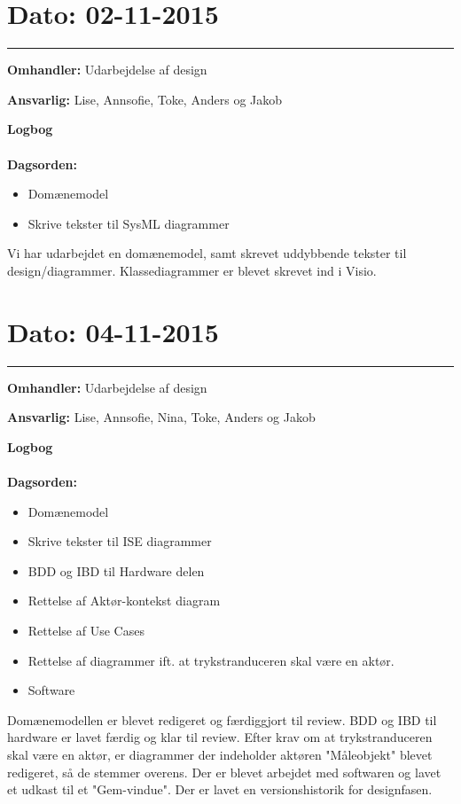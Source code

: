 \section{Dato: 02-11-2015 }
\hrule

\textbf{Omhandler:} Udarbejdelse af design  

\textbf{Ansvarlig:} Lise, Annsofie, Toke, Anders og Jakob

\textbf{Logbog}
\\
\\
\textbf{Dagsorden:}
\begin{itemize}
	\item Domænemodel
	\item Skrive tekster til SysML diagrammer
\end{itemize}

Vi har udarbejdet en domænemodel, samt skrevet uddybbende tekster til design/diagrammer. 
Klassediagrammer er blevet skrevet ind i Visio. 



\section{Dato: 04-11-2015 }
\hrule

\textbf{Omhandler:} Udarbejdelse af design  

\textbf{Ansvarlig:} Lise, Annsofie, Nina, Toke, Anders og Jakob

\textbf{Logbog}
\\
\\
\textbf{Dagsorden:}
\begin{itemize}
	\item Domænemodel
	\item Skrive tekster til ISE diagrammer
	\item BDD og IBD til Hardware delen
	\item Rettelse af Aktør-kontekst diagram
	\item Rettelse af Use Cases
	\item Rettelse af diagrammer ift. at trykstranduceren skal være en aktør.
	\item Software
\end{itemize}

Domænemodellen er blevet redigeret og færdiggjort til review.
BDD og IBD til hardware er lavet færdig og klar til review.
Efter krav om at trykstranduceren skal være en aktør, er diagrammer der indeholder aktøren "Måleobjekt" blevet redigeret, så de stemmer overens.
Der er blevet arbejdet med softwaren og lavet et udkast til et "Gem-vindue".
Der er lavet en versionshistorik for designfasen.



